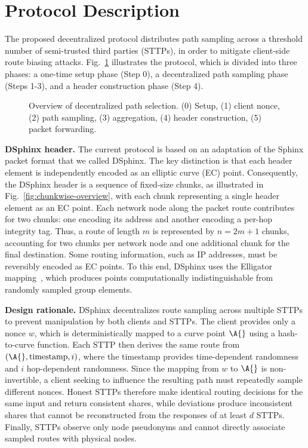\section{Protocol Description}\label{sec:scheme}

The proposed decentralized protocol distributes path sampling across a threshold number of semi-trusted third parties (STTPs), in order to mitigate client-side route biasing attacks. 
Fig.~\ref{fig:overall_schema} illustrates the protocol, which is divided into three phases: 
a one-time setup phase (Step 0), a decentralized path sampling phase (Steps 1-3), and a header construction phase (Step 4).

\begin{figure}
    \centering
    \resizebox{0.9\linewidth}{!}{}
    \caption{Overview of decentralized path selection.
    (0) Setup, (1) client nonce, (2) path sampling, (3) aggregation, (4) header construction, (5) packet forwarding.}
    \label{fig:overall_schema}
\end{figure}

\noindent\textbf{DSphinx header.} 
The current protocol is based on an adaptation of the Sphinx packet format that we called DSphinx.
The key distinction is that each header element is independently encoded as an elliptic curve (EC) point. 
Consequently, the DSphinx header is a sequence of fixed-size chunks, as illustrated in Fig.~\ref{fig:chunkwise-overview}, with each chunk representing a single header element as an EC point.
Each network node along the packet route contributes for two chunks: one encoding its address and another encoding a per-hop integrity tag. 
Thus, a route of length $m$ is represented by $n = 2m + 1$ chunks, accounting for two chunks per network node and one additional chunk for the final destination.
Some routing information, such as IP addresses, must be reversibly encoded as EC points. 
To this end, DSphinx uses the Elligator mapping~\cite{bernstein2013elligator}, which produces points computationally indistinguishable from randomly sampled group elements.

\smallskip
\noindent\textbf{Design rationale.}
DSphinx decentralizes route sampling across multiple STTPs to prevent manipulation by both clients and STTPs. 
The client provides only a nonce $w$, which is deterministically mapped to a curve point $\A{}$ using a hash-to-curve function. 
Each STTP then derives the same route from $(\A{},\text{timestamp},i)$, where the timestamp provides time-dependent randomness and $i$ hop-dependent randomness. 
Since the mapping from $w$ to $\A{}$ is non-invertible, a client seeking to influence the resulting path must repeatedly sample different nonces. 
Honest STTPs therefore make identical routing decisions for the same input and return consistent shares, while deviations produce inconsistent shares that cannot be reconstructed from the responses of at least $d$ STTPs. 
Finally, STTPs observe only node pseudonyms and cannot directly associate sampled routes with physical nodes.

